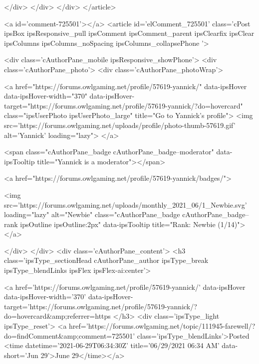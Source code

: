 	
</div>
</div>
	</div>
</article>
					
				
					
					
					



<a id='comment-725501'></a>
<article  id='elComment_725501' class='cPost ipsBox ipsResponsive_pull  ipsComment  ipsComment_parent ipsClearfix ipsClear ipsColumns ipsColumns_noSpacing ipsColumns_collapsePhone    '>
	

	

	<div class='cAuthorPane_mobile ipsResponsive_showPhone'>
		<div class='cAuthorPane_photo'>
			<div class='cAuthorPane_photoWrap'>
				


	<a href="https://forums.owlgaming.net/profile/57619-yannick/" data-ipsHover data-ipsHover-width="370" data-ipsHover-target="https://forums.owlgaming.net/profile/57619-yannick/?do=hovercard" class="ipsUserPhoto ipsUserPhoto_large" title="Go to Yannick's profile">
		<img src='https://forums.owlgaming.net/uploads/profile/photo-thumb-57619.gif' alt='Yannick' loading="lazy">
	</a>

				
				<span class="cAuthorPane_badge cAuthorPane_badge--moderator" data-ipsTooltip title="Yannick is a moderator"></span>
				
				
					<a href="https://forums.owlgaming.net/profile/57619-yannick/badges/">
						
<img src='https://forums.owlgaming.net/uploads/monthly_2021_06/1_Newbie.svg' loading="lazy" alt="Newbie" class="cAuthorPane_badge cAuthorPane_badge--rank ipsOutline ipsOutline:2px" data-ipsTooltip title="Rank: Newbie (1/14)">
					</a>
				
			</div>
		</div>
		<div class='cAuthorPane_content'>
			<h3 class='ipsType_sectionHead cAuthorPane_author ipsType_break ipsType_blendLinks ipsFlex ipsFlex-ai:center'>
				


<a href='https://forums.owlgaming.net/profile/57619-yannick/' data-ipsHover data-ipsHover-width='370' data-ipsHover-target='https://forums.owlgaming.net/profile/57619-yannick/?do=hovercard&amp;referrer=https%
			</h3>
			<div class='ipsType_light ipsType_reset'>
				<a href='https://forums.owlgaming.net/topic/111945-farewell/?do=findComment&amp;comment=725501' class='ipsType_blendLinks'>Posted <time datetime='2021-06-29T06:34:30Z' title='06/29/2021 06:34  AM' data-short='Jun 29'>June 29</time></a>
				

